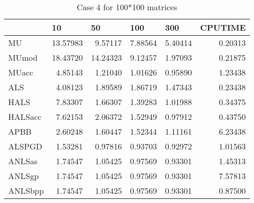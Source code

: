 \documentclass{article}
\begin{document}
\begin{table}[H]
		\caption{Case 4 for 100*100 matrices}
	\centering
	\begin{tabular}{|l|r|r|r|r|r|}
		\hline
		& \multicolumn{1}{l|}{10}      & \multicolumn{1}{l|}{50}      & \multicolumn{1}{l|}{100}     & \multicolumn{1}{l|}{300}     & \multicolumn{1}{l|}{CPUTIME} \\ \hline
		MU       & 13.57983                     & 9.57117                      & 7.88564                      & 5.40414                      & 0.20313                      \\ \hline
		MUmod    & 18.43720                     & 14.24323                     & 9.12457                      & 1.97093                      & 0.21875                      \\ \hline
		MUacc    & 4.85143                      & 1.21040                      & 1.01626                      & 0.95890                      & 1.23438                      \\ \hline
		ALS      & \multicolumn{1}{r|}{4.08123} & \multicolumn{1}{r|}{1.89589} & \multicolumn{1}{r|}{1.86719} & \multicolumn{1}{r|}{1.47343} & \multicolumn{1}{r|}{0.23438} \\ \hline
		HALS     & 7.83307                      & 1.66307                      & 1.39283                      & 1.01988                      & 0.34375                      \\ \hline
		HALSacc  & 7.62153                      & 2.06372                      & 1.52949                      & 0.97912                      & 0.43750                      \\ \hline
		APBB     & 2.60248                      & 1.60447                      & 1.52344                      & 1.11161                      & 6.23438                      \\ \hline
		ALSPGD   & 1.53281                      & 0.97816                      & 0.93703                      & 0.92972                      & 1.01563                      \\ \hline
		ANLSas   & 1.74547                      & 1.05425                      & 0.97569                      & 0.93301                      & 1.45313                      \\ \hline
		ANLSgp   & 1.74547                      & 1.05425                      & 0.97569                      & 0.93301                      & 7.57813                      \\ \hline
		ANLSbpp  & 1.74547                      & 1.05425                      & 0.97569                      & 0.93301                      & 0.87500                      \\ \hline

\end{tabular}
\end{table}
\end{document}
